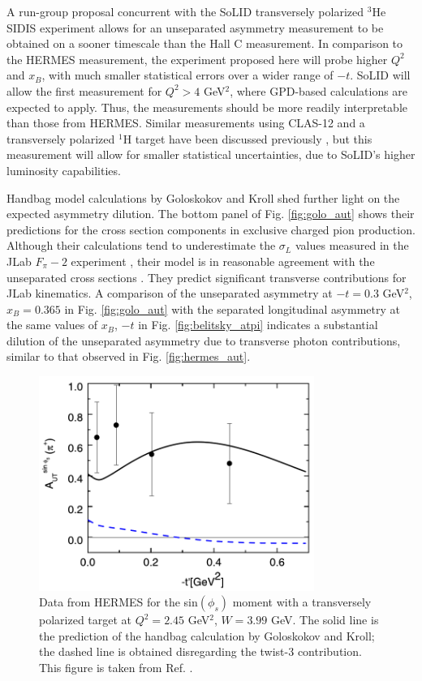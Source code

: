 A run-group proposal concurrent with the SoLID transversely polarized $^3$He
SIDIS experiment allows for an unseparated asymmetry measurement to be obtained
on a sooner timescale than the Hall C measurement.  In comparison to the HERMES
measurement, the experiment proposed here will probe higher $Q^2$ and $x_B$,
with much smaller statistical errors over a wider range of $-t$.
SoLID will allow the first measurement for $Q^2>4$ GeV$^2$, where GPD-based
calculations are expected to apply.  Thus, the measurements should be more
readily interpretable than those from HERMES.  Similar measurements using
CLAS-12 and a transversely polarized $^1$H target have been discussed
previously \cite{clas}, but this measurement will allow for smaller statistical
uncertainties, due to SoLID's higher luminosity capabilities.

Handbag model calculations by Goloskokov and Kroll \cite{GoPC} shed further
light on the expected asymmetry dilution.  The bottom panel of
Fig. \ref{fig:golo_aut} shows their predictions for the cross section
components in exclusive charged pion production.  Although their calculations
tend to underestimate the $\sigma_L$ values measured in the JLab $F_{\pi}-2$
experiment \cite{Fpi2}, their model is in reasonable agreement with the
unseparated cross sections \cite{Go10}.  They predict significant transverse
contributions for JLab kinematics.  A comparison of the unseparated asymmetry
at $-t=0.3$ GeV$^2$, $x_B=0.365$ in Fig. \ref{fig:golo_aut} with the separated
longitudinal asymmetry at the same values of $x_B$, $-t$ in
Fig. \ref{fig:belitsky_atpi} indicates a substantial dilution of the
unseparated asymmetry due to transverse photon contributions, similar to that
observed in Fig. \ref{fig:hermes_aut}.

\begin{figure}[hbt!]
\begin{center}
\includegraphics[height=7cm]{./figures/hermes_sinphiS.png}
\end{center}
\caption{\label{fig:hermes_phiS}
\footnotesize{
Data from HERMES for the sin$(\phi_s)$ moment with a transversely polarized
target at $Q^2=2.45$ GeV$^2$, $W=3.99$ GeV.  The solid line is the prediction
of the handbag calculation by Goloskokov and Kroll; the dashed line is obtained
disregarding the twist-3 contribution.  This figure is taken from
Ref. .}}
\end{figure}

